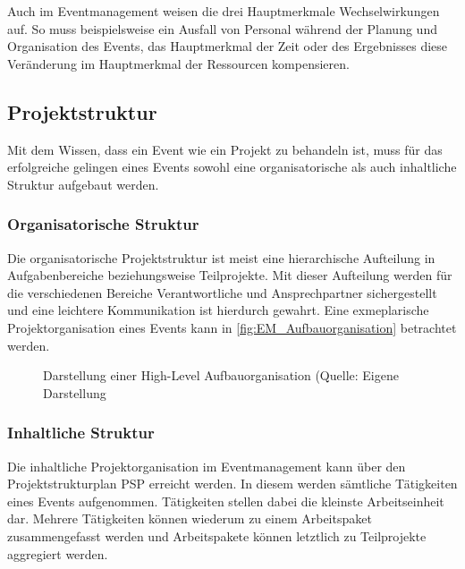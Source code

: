 Auch im Eventmanagement weisen die drei Hauptmerkmale Wechselwirkungen auf.
So muss beispielsweise ein Ausfall von Personal während der Planung und Organisation des Events, das Hauptmerkmal der Zeit oder des Ergebnisses diese Veränderung im Hauptmerkmal der Ressourcen kompensieren. 


\subsection{Projektstruktur}
Mit dem Wissen, dass ein Event wie ein Projekt zu behandeln ist, muss für das erfolgreiche gelingen eines Events sowohl eine organisatorische als auch inhaltliche Struktur aufgebaut werden.

\subsubsection{Organisatorische Struktur}
Die organisatorische Projektstruktur ist meist eine hierarchische Aufteilung in Aufgabenbereiche beziehungsweise Teilprojekte.
Mit dieser Aufteilung werden für die verschiedenen Bereiche Verantwortliche und Ansprechpartner sichergestellt und eine leichtere Kommunikation ist hierdurch gewahrt.
Eine exmeplarische Projektorganisation eines Events kann in \autoref{fig:EM_Aufbauorganisation} betrachtet werden. 

\begin{figure}[H]
    \centering
    \setlength{\fboxsep}{10pt}
    \setlength{\fboxrule}{0.5pt}
    \caption[Eventmanagement: Aufbauorganisation]{Darstellung einer High-Level Aufbauorganisation (Quelle: Eigene Darstellung} \label{fig:EM_Aufbauorganisation}
\end{figure}

\subsubsection{Inhaltliche Struktur}
Die inhaltliche Projektorganisation im Eventmanagement kann über den Projektstrukturplan PSP\autocite[]{projektmanagementdefinitionen.de.o.J.} erreicht werden.
In diesem werden sämtliche Tätigkeiten eines Events aufgenommen.
Tätigkeiten stellen dabei die kleinste Arbeitseinheit dar.
Mehrere Tätigkeiten können wiederum zu einem Arbeitspaket zusammengefasst werden und Arbeitspakete können letztlich zu Teilprojekte aggregiert werden.\autocite[Vgl.][S. 144 f.]{Holzbaur.2002}

